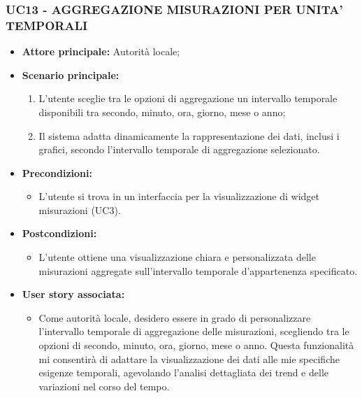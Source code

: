 \subsubsection{UC13 - AGGREGAZIONE MISURAZIONI PER UNITA' TEMPORALI}
\begin{itemize}
    \item \textbf{Attore principale:} Autorità locale;
    \item \textbf{Scenario principale:}
          \begin{enumerate}
             \item L'utente sceglie tra le opzioni di aggregazione un intervallo temporale disponibili tra secondo, minuto, ora, giorno, mese o anno;
             \item Il sistema adatta dinamicamente la rappresentazione dei dati, inclusi i grafici, secondo l'intervallo temporale di aggregazione selezionato.
          \end{enumerate}
    \item \textbf{Precondizioni:}
          \begin{itemize}
              \item  L'utente si trova in un interfaccia per la visualizzazione di widget misurazioni  (UC3).
          \end{itemize}
    \item \textbf{Postcondizioni:}
          \begin{itemize}
              \item  L'utente ottiene una visualizzazione chiara e personalizzata delle misurazioni aggregate sull'intervallo temporale d'appartenenza specificato.
          \end{itemize}
    \item \textbf{User story associata:}
          \begin{itemize}
              \item Come autorità locale, desidero essere in grado di personalizzare l'intervallo temporale di aggregazione delle misurazioni, scegliendo tra le opzioni di secondo, minuto, ora, giorno, mese o anno. Questa funzionalità mi consentirà di adattare la visualizzazione dei dati alle mie specifiche esigenze temporali, agevolando l'analisi dettagliata dei trend e delle variazioni nel corso del tempo.
          \end{itemize}
\end{itemize}